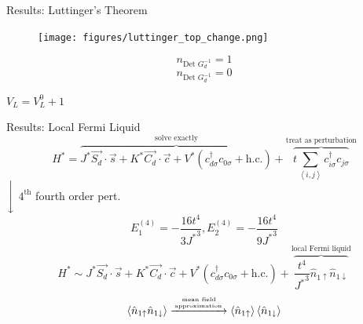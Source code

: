 \documentclass[aspectratio=169]{beamer}
\begin{document}
\begin{frame}{Results: Luttinger's Theorem}
\begin{minipage}{0.6\textwidth}
\begin{figure}[htpb]
	\centering
	\texttt{[image: figures/luttinger\_top\_change.png]}
\end{figure}
\end{minipage}
\begin{minipage}{0.39\textwidth}
	\vspace*{5pt}
	{\large \[n_{\text{Det }G_d^{-1}} = 1\]
	\vspace*{45pt}
	\[n_{\text{Det }G_d^{-1}} = 0\]}
\end{minipage}
\vspace*{10pt}
\begin{center}
{ \LARGE \(V_L = V_L^0 + 1\)}
\end{center}
\end{frame}

\begin{frame}{Results: Local Fermi Liquid}
	\[H^* = \overbrace{J^* \vec{S_d}\cdot\vec{s} + K^* \vec{C_d}\cdot\vec{c} + V^* \left( c^\dagger_{d\sigma}c_{0\sigma} + \text{h.c.} \right)}^\text{solve exactly} + \overbrace{t\sum_{\left<i,j \right>}c^\dagger_{i\sigma}c_{j\sigma}}^\text{treat as perturbation}\]
	\hspace*{0.5\textwidth}$\Bigg\downarrow$ \(4^\text{th}\) fourth order pert.
	\[E_1^{(4)} = -\frac{16t^4}{3{J^*}^3}, E_2^{(4)} = -\frac{16t^4}{9{J^*}^3}\]
	\[H^* \sim J^* \vec{S_d}\cdot\vec{s} + K^* \vec{C_d}\cdot\vec{c} + V^* \left( c^\dagger_{d\sigma}c_{0\sigma} + \text{h.c.} \right) + \overbrace{\frac{t^4}{{J^*}^3} \hat n_{1 \uparrow}\hat n_{1 \downarrow}}^\text{local Fermi liquid}\]
	\[ \left< \hat n_{1 \uparrow}\hat n_{1 \downarrow}\right> \xrightarrow{\text{mean field}\atop \text{approximation}} \left<\hat n_{1 \uparrow}\right>\left< \hat n_{1 \downarrow}\right>\]
\end{frame}
\end{document}
